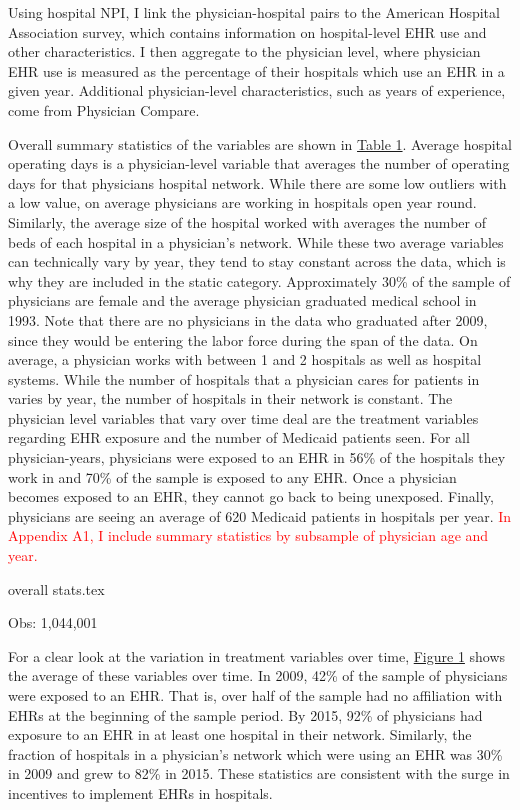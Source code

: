 \documentclass[11pt]{article}
\begin{document}
Using hospital NPI, I link the physician-hospital pairs to the American Hospital Association survey, which contains information on hospital-level EHR use and other characteristics. I then aggregate to the physician level, where physician EHR use is measured as the percentage of their hospitals which use an EHR in a given year. Additional physician-level characteristics, such as years of experience, come from Physician Compare. 

Overall summary statistics of the variables are shown in \hyperref[fig:summarystatistics]{Table 1}. Average hospital operating days is a physician-level variable that averages the number of operating days for that physicians hospital network. While there are some low outliers with a low value, on average physicians are working in hospitals open year round. Similarly, the average size of the hospital worked with averages the number of beds of each hospital in a physician's network. While these two average variables can technically vary by year, they tend to stay constant across the data, which is why they are included in the static category. Approximately 30\% of the sample of physicians are female and the average physician graduated medical school in 1993. Note that there are no physicians in the data who graduated after 2009, since they would be entering the labor force during the span of the data. On average, a physician works with between 1 and 2 hospitals as well as hospital systems. While the number of hospitals that a physician cares for patients in varies by year, the number of hospitals in their network is constant. The physician level variables that vary over time deal are the treatment variables regarding EHR exposure and the number of Medicaid patients seen. For all physician-years, physicians were exposed to an EHR in 56\% of the hospitals they work in and 70\% of the sample is exposed to any EHR. Once a physician becomes exposed to an EHR, they cannot go back to being unexposed. Finally, physicians are seeing an average of 620 Medicaid patients in hospitals per year. \textcolor{red}{In Appendix A1, I include summary statistics by subsample of physician age and year.} 


\begin{table}[ht]
    {overall stats.tex}
    \label{fig:summarystatistics}
    \vspace{1mm}
    \caption*{\footnotesize Obs: 1,044,001}
\end{table}



For a clear look at the variation in treatment variables over time, \hyperref[fig:figure1]{Figure 1} shows the average of these variables over time. In 2009, 42\% of the sample of physicians were exposed to an EHR. That is, over half of the sample had no affiliation with EHRs at the beginning of the sample period. By 2015, 92\% of physicians had exposure to an EHR in at least one hospital in their network. Similarly, the fraction of hospitals in a physician's network which were using an EHR was 30\% in 2009 and grew to 82\% in 2015. These statistics are consistent with the surge in incentives to implement EHRs in hospitals. 
\end{document}

